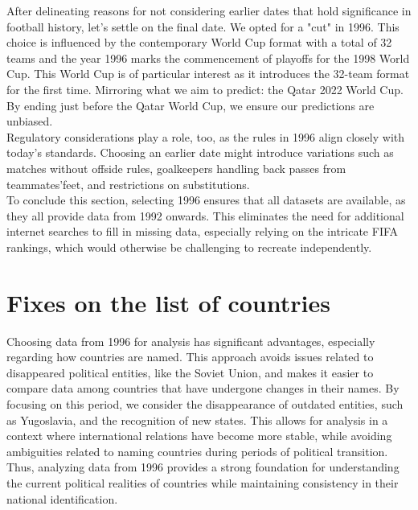 After delineating reasons for not considering earlier dates that hold significance in football history, let's settle on the final date. We opted for a "cut" in 1996. This choice is influenced by the contemporary World Cup format with a total of 32 teams and the year 1996 marks the commencement of playoffs for the 1998 World Cup. This World Cup is of particular interest as it introduces the 32-team format for the first time. Mirroring what we aim to predict: the Qatar 2022 World Cup. By ending just before the Qatar World Cup, we ensure our predictions are unbiased.\\

Regulatory considerations play a role, too, as the rules in 1996 align closely with today's standards. Choosing an earlier date might introduce variations such as matches without offside rules, goalkeepers handling back passes from teammates'feet, and restrictions on substitutions.\\

To conclude this section, selecting 1996 ensures that all datasets are available, as they all provide data from 1992 onwards. This eliminates the need for additional internet searches to fill in missing data, especially relying on the intricate FIFA rankings, which would otherwise be challenging to recreate independently.\\
\newpage
\section{Fixes on the list of countries}

Choosing data from 1996 for analysis has significant advantages, especially regarding how countries are named. This approach avoids issues related to disappeared political entities, like the Soviet Union, and makes it easier to compare data among countries that have undergone changes in their names. By focusing on this period, we consider the disappearance of outdated entities, such as Yugoslavia, and the recognition of new states. This allows for analysis in a context where international relations have become more stable, while avoiding ambiguities related to naming countries during periods of political transition. Thus, analyzing data from 1996 provides a strong foundation for understanding the current political realities of countries while maintaining consistency in their national identification.\\

